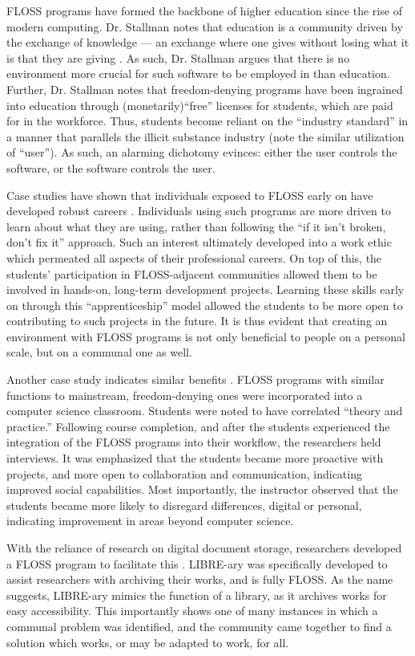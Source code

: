 \documentclass[conference]{IEEEtran}
\begin{document}
FLOSS programs have formed the backbone of higher education since the rise of modern computing. Dr. Stallman notes that education is a community driven by the exchange of knowledge — an exchange where one gives without losing what it is that they are giving \cite{Stallman}. As such, Dr. Stallman argues that there is no environment more crucial for such software to be employed in than education. Further, Dr. Stallman notes that freedom-denying programs have been ingrained into education through (monetarily)``free'' licenses for students, which are paid for in the workforce. Thus, students become reliant on the ``industry standard'' in a manner that parallels the illicit substance industry (note the similar utilization of ``user''). As such, an alarming dichotomy evinces: either the user controls the software, or the software controls the user.

Case studies have shown that individuals exposed to FLOSS early on have developed robust careers \cite{LifelongLearning}. Individuals using such programs are more driven to learn about what they are using, rather than following the ``if it isn't broken, don't fix it'' approach. Such an interest ultimately developed into a work ethic which permeated all aspects of their professional careers. On top of this, the students' participation in FLOSS-adjacent communities allowed them to be involved in hands-on, long-term development projects. Learning these skills early on through this ``apprenticeship'' model allowed the students to be more open to contributing to such projects in the future. It is thus evident that creating an environment with FLOSS programs is not only beneficial to people on a personal scale, but on a communal one as well.

Another case study indicates similar benefits \cite{StudentExperience}. FLOSS programs with similar functions to mainstream, freedom-denying ones were incorporated into a computer science classroom. Students were noted to have correlated ``theory and practice.'' Following course completion, and after the students experienced the integration of the FLOSS programs into their workflow, the researchers held interviews. It was emphasized that the students became more proactive with projects, and more open to collaboration and communication, indicating improved social capabilities. Most importantly, the instructor observed that the students became more likely to disregard differences, digital or personal, indicating improvement in areas beyond computer science.

With the reliance of research on digital document storage, researchers developed a FLOSS program to facilitate this \cite{LIBREary}. LIBRE-ary was specifically developed to assist researchers with archiving their works, and is fully FLOSS. As the name suggests, LIBRE-ary mimics the function of a library, as it archives works for easy accessibility. This importantly shows one of many instances in which a communal problem was identified, and the community came together to find a solution which works, or may be adapted to work, for all.
\end{document}
